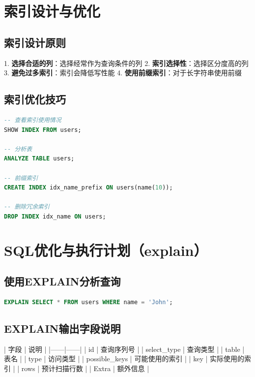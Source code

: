 \documentclass[12pt,UTF8]{ctexbook}
\begin{document}
\section{索引设计与优化}
\label{sec:index-optimization}

\subsection*{索引设计原则}

1. \textbf{选择合适的列}：选择经常作为查询条件的列
2. \textbf{索引选择性}：选择区分度高的列
3. \textbf{避免过多索引}：索引会降低写性能
4. \textbf{使用前缀索引}：对于长字符串使用前缀

\subsection*{索引优化技巧}

\begin{lstlisting}[language=sql]
-- 查看索引使用情况
SHOW INDEX FROM users;

-- 分析表
ANALYZE TABLE users;

-- 前缀索引
CREATE INDEX idx_name_prefix ON users(name(10));

-- 删除冗余索引
DROP INDEX idx_name ON users;
\end{lstlisting}

\section{SQL优化与执行计划（explain）}
\label{sec:sql-optimization}

\subsection*{使用EXPLAIN分析查询}

\begin{lstlisting}[language=sql]
EXPLAIN SELECT * FROM users WHERE name = 'John';
\end{lstlisting}

\subsection*{EXPLAIN输出字段说明}

| 字段 | 说明 |
|------|------|
| id | 查询序列号 |
| select\_type | 查询类型 |
| table | 表名 |
| type | 访问类型 |
| possible\_keys | 可能使用的索引 |
| key | 实际使用的索引 |
| rows | 预计扫描行数 |
| Extra | 额外信息 |
\end{document}
